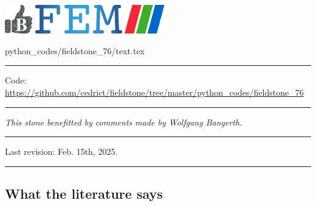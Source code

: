 \noindent
\includegraphics[height=1.25cm]{images/pictograms/benchmark}
\includegraphics[height=1.25cm]{images/pictograms/FEM}
\includegraphics[height=1.25cm]{images/pictograms/paraview}


\begin{flushright} {\tiny {\color{gray} python\_codes/fieldstone\_76/text.tex}} \end{flushright}


\par\noindent\rule{\textwidth}{0.4pt}

\begin{center}
\inpython \hspace{0.5cm}
{\small Code: \url{https://github.com/cedrict/fieldstone/tree/master/python_codes/fieldstone_76}}
\end{center}

\par\noindent\rule{\textwidth}{0.4pt}

{\sl This stone benefitted by comments made by Wolfgang Bangerth}. %

\par\noindent\rule{\textwidth}{0.4pt}

Last revision: Feb. 15th, 2025.

\par\noindent\rule{\textwidth}{0.4pt}


\subsection*{What the literature says}

